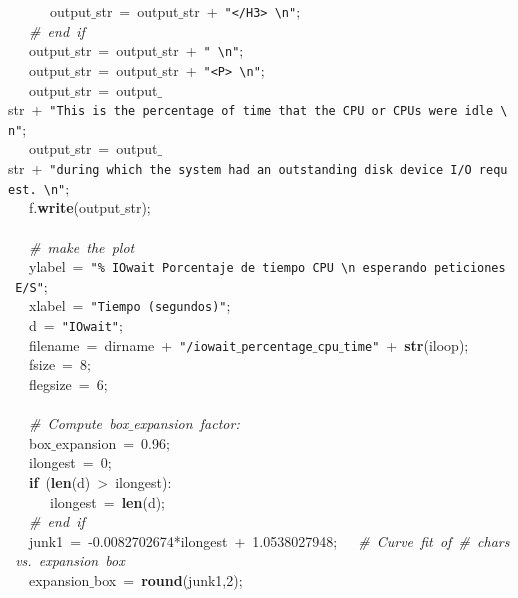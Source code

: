 \mbox{}\ \ \ \ \ \ output$\_$str\ =\ output$\_$str\ +\ \texttt{"{}\textless{}/H3\textgreater{}\ \textbackslash{}n"{}}; \\
\mbox{}\ \ \ \textit{\#\ end\ if} \\
\mbox{}\ \ \ output$\_$str\ =\ output$\_$str\ +\ \texttt{"{}\ \textbackslash{}n"{}}; \\
\mbox{}\ \ \ output$\_$str\ =\ output$\_$str\ +\ \texttt{"{}\textless{}P\textgreater{}\ \textbackslash{}n"{}}; \\
\mbox{}\ \ \ output$\_$str\ =\ output$\_$str\ +\ \texttt{"{}This\ is\ the\ percentage\ of\ time\ that\ the\ CPU\ or\ CPUs\ were\ idle\ \textbackslash{}n"{}}; \\
\mbox{}\ \ \ output$\_$str\ =\ output$\_$str\ +\ \texttt{"{}during\ which\ the\ system\ had\ an\ outstanding\ disk\ device\ I/O\ request.\ \textbackslash{}n"{}}; \\
\mbox{}\ \ \ f.\textbf{write}(output$\_$str); \\
\mbox{}\ \ \  \\
\mbox{}\ \ \ \textit{\#\ make\ the\ plot} \\
\mbox{}\ \ \ ylabel\ =\ \texttt{"{}\%\ IOwait\ Porcentaje\ de\ tiempo\ CPU\ \textbackslash{}n\ esperando\ peticiones\ E/S"{}}; \\
\mbox{}\ \ \ xlabel\ =\ \texttt{"{}Tiempo\ (segundos)"{}}; \\
\mbox{}\ \ \ d\ =\ \texttt{"{}IOwait"{}}; \\
\mbox{}\ \ \ filename\ =\ dirname\ +\ \texttt{"{}/iowait$\_$percentage$\_$cpu$\_$time"{}}\ +\ \textbf{str}(iloop); \\
\mbox{}\ \ \ fsize\ =\ 8; \\
\mbox{}\ \ \ flegsize\ =\ 6; \\
\mbox{}\ \ \  \\
\mbox{}\ \ \ \textit{\#\ Compute\ box$\_$expansion\ factor:} \\
\mbox{}\ \ \ box$\_$expansion\ =\ 0.96; \\
\mbox{}\ \ \ ilongest\ =\ 0; \\
\mbox{}\ \ \ \textbf{if}\ (\textbf{len}(d)\ \textgreater{}\ ilongest): \\
\mbox{}\ \ \ \ \ \ ilongest\ =\ \textbf{len}(d); \\
\mbox{}\ \ \ \textit{\#\ end\ if} \\
\mbox{}\ \ \ junk1\ =\ -0.0082702674*ilongest\ +\ 1.0538027948;\ \ \ \textit{\#\ Curve\ fit\ of\ \#\ chars\ vs.\ expansion\ box} \\
\mbox{}\ \ \ expansion$\_$box\ =\ \textbf{round}(junk1,2); \\
